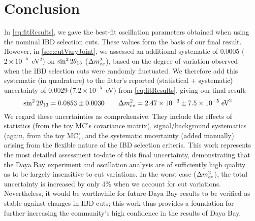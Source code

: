 \documentclass[../thesis.tex]{subfiles}
\begin{document}
\chapter{Conclusion}
\label{chap:conclusion}


In \autoref{eq:fitResults}, we gave the best-fit oscillation parameters obtained when using the nominal IBD selection cuts. These values form the basis of our final result. However, in \autoref{sec:cutVaryJoint}, we assessed an additional systematic of 0.0005 ($2\times10^{-5}$~eV$^2$) on $\sin^2 2\theta_{13}$ ($\Delta m^2_{ee}$), based on the degree of variation observed when the IBD selection cuts were randomly fluctuated. We therefore add this systematic (in quadrature) to the fitter's reported (statistical + systematic) uncertainty of 0.0029 ($7.2\times10^{-5}$~eV) from \autoref{eq:fitResults}, giving our final result:
\begin{equation}
  \sin^2 2\theta_{13} = 0.0853 \pm 0.0030 \qquad \Delta m^2_{ee} = 2.47\times10^{-3} \pm 7.5\times10^{-5}\;\text{eV}^2
\end{equation}
We regard these uncertainties as comprehensive: They include the effects of statistics (from the toy MC's covariance matrix), signal/background systematics (again, from the toy MC), and the systematic uncertainty (added manually) arising from the flexible nature of the IBD selection criteria. This work represents the most detailed assessment to-date of this final uncertainty, demonstrating that the Daya Bay experiment and oscillation analysis are of sufficiently high quality as to be largely insensitive to cut variations. In the worst case ($\Delta m^2_{ee}$), the total uncertainty is increased by only 4\% when we account for cut variations. Nevertheless, it would be worthwhile for future Daya Bay results to be verified as stable against changes in IBD cuts; this work thus provides a foundation for further increasing the community's high confidence in the results of Daya Bay.


\end{document}
